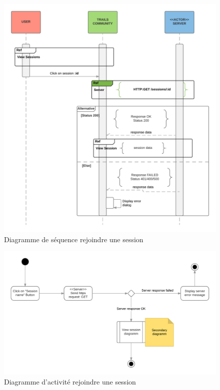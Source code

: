 \documentclass[titlepage, 12pt]{report}
\begin{document}
\begin{figure}[!h]
	\caption{Diagramme de séquence rejoindre une session}
	\label{join_session_sequence_diagram}
	\centering
	\includegraphics[scale=0.7]{Images/diagram/selection_session_sequence_diagram.png}
\end{figure}


\begin{figure}[!h]
	\caption{Diagramme d'activité rejoindre une session}
	\label{join_session_activity_diagram}
	\centering
	\includegraphics[scale=0.7]{Images/diagram/selection_session_activity_diagram.png}
\end{figure}
\end{document}
